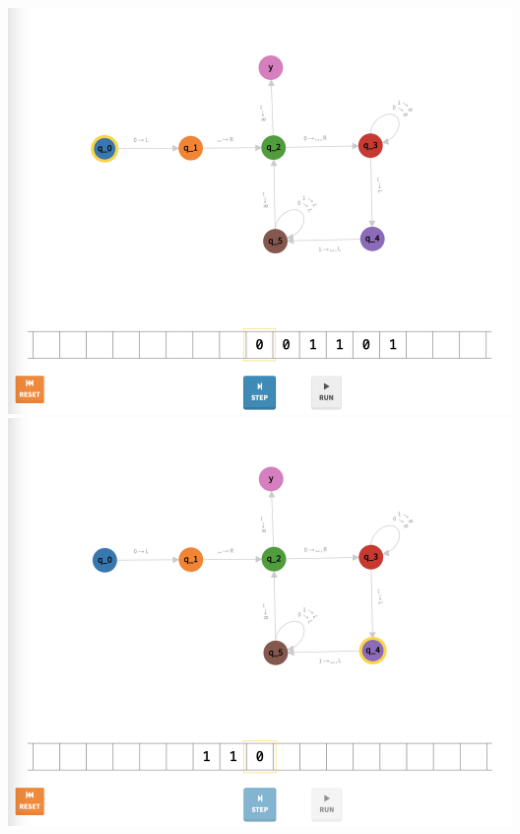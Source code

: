 \documentclass[a4paper]{article}
\begin{document}
\begin{center}
\includegraphics[width=\textwidth]{TM1.11}
\includegraphics[width=\textwidth]{TM1.12}
\end{center}
\newpage
\end{document}
